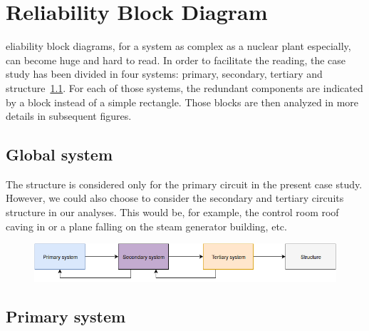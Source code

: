 %
%

\chapter{Reliability Block Diagram}
\label{app:app01}

eliability block diagrams, for a system as complex as a nuclear plant especially, can become huge and hard to read. In order to facilitate the reading, the case study has been divided in four systems: primary, secondary, tertiary and structure~\ref{fig:rbd_global}. For each of those systems, the redundant components are indicated by a block instead of a simple rectangle. Those blocks are then analyzed in more details in subsequent figures.

\section{Global system}

The structure is considered only for the primary circuit in the present case study. However, we could also choose to consider the secondary and tertiary circuits structure in our analyses. This would be, for example, the control room roof caving in or a plane falling on the steam generator building, etc.

\begin{figure}[!htb]
	\centering
	\includegraphics[height=0.1\textheight]{fig0a/main_RBD}
	\label{fig:rbd_global}
\end{figure}

\cleardoublepage

\section{Primary system}

